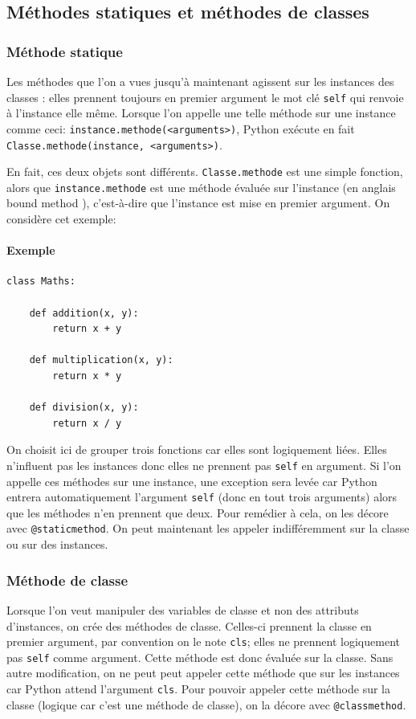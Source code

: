 \documentclass[a4paper, 10pt]{article}
\begin{document}
\subsection{Méthodes statiques et méthodes de classes}
\subsubsection{Méthode statique}
Les méthodes que l'on a vues jusqu'à maintenant agissent sur les instances des classes : elles prennent toujours en premier argument le mot clé \texttt{self} qui renvoie à l'instance elle même. Lorsque l'on appelle une telle méthode sur une instance comme ceci:
\texttt
{instance.methode(<arguments>)},
Python exécute en fait \texttt{Classe.methode(instance, <arguments>)}.\bigskip

En fait, ces deux objets sont différents. \texttt{Classe.methode} est une simple fonction, alors que \texttt{instance.methode} est une méthode évaluée sur l'instance (en anglais \og bound method \fg{}), c'est-à-dire que l'instance est mise en premier argument. On considère cet exemple:

\paragraph{Exemple}
\begin{verbatim}
class Maths:

    def addition(x, y):
        return x + y

    def multiplication(x, y):
        return x * y

    def division(x, y):
        return x / y
\end{verbatim}
On choisit ici de grouper trois fonctions car elles sont logiquement liées. Elles n'influent pas les instances donc elles ne prennent pas \texttt{self} en argument. Si l'on appelle ces méthodes sur une instance, une exception sera levée car Python entrera automatiquement l'argument \texttt{self} (donc en tout trois arguments) alors que les méthodes n'en prennent que deux. Pour remédier à cela, on les décore avec \texttt{@staticmethod}. On peut maintenant les appeler indifféremment sur la classe ou sur des instances.

\subsubsection{Méthode de classe}
\label{sec:classmethod}
Lorsque l'on veut manipuler des variables de classe et non des attributs d'instances, on crée des méthodes de classe. Celles-ci prennent la classe en premier argument, par convention on le note \texttt{cls}; elles ne prennent logiquement pas \texttt{self} comme argument. Cette méthode est donc évaluée sur la classe. Sans autre modification, on ne peut peut appeler cette méthode que sur les instances car Python attend l'argument \texttt{cls}. Pour pouvoir appeler cette méthode sur la classe (logique car c'est une méthode de classe), on la décore avec \texttt{@classmethod}.
\end{document}
